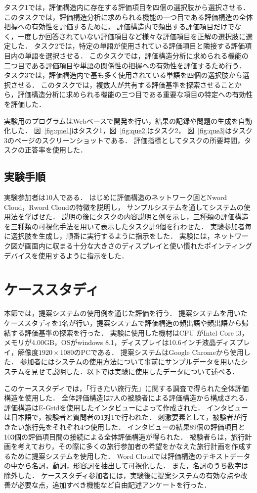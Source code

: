 \documentclass[syuuron]{kuee}
\begin{document}
			タスク1では，評価構造内に存在する評価項目を四個の選択肢から選択させる．
			このタスクでは，評価構造分析に求められる機能の一つ目である評価構造の全体把握への有効性を評価するために，
			評価構造内で頻出する評価項目だけでなく，一度しか回答されていない評価項目など様々な評価項目を正解の選択肢に選定した．
			タスク2では，特定の単語が使用されている評価項目と隣接する評価項目内の単語を選択させる．
			このタスクでは，評価構造分析に求められる機能の二つ目である評価項目や単語の関係性の把握への有効性を評価するため行う．
			タスク3では，評価構造内で基も多く使用されている単語を四個の選択肢から選択させる．
			このタスクでは，複数人が共有する評価基準を探索させることから，評価構造分析に求められる機能の三つ目である重要な項目の特定への有効性を評価した．
			
			実験用のプログラムはWebベースで開発を行い，結果の記録や問題の生成を自動化した．
			図~\ref{fig:que1}はタスク1，図~\ref{fig:que2}はタスク2，
			図~\ref{fig:que3}はタスク3のページのスクリーンショットである．
			評価指標としてタスクの所要時間，タスクの正答率を使用した．
		
		\subsection{実験手順}
			実験参加者は10人である．
			はじめに評価構造のネットワーク図とNword Cloud，Rword Cloudの特徴を説明し，
			サンプルシステムを通してシステムの使用法を学ばせた．
			説明の後にタスクの内容説明と例を示し，三種類の評価構造を三種類の可視化手法を用いて表示したタスク計9個を行わせた．
			実験参加者毎に選択肢を生成し，順番に実行するように指示をした．
			実験には，ネットワーク図が画面内に収まる十分な大きさのディスプレイと使い慣れたポインティングデバイスを使用するように指示をした．
		
	\section{ケーススタディ}
		本節では，提案システムの使用例を通じた評価を行う．
		提案システムを用いたケーススタディを1名が行い，提案システムで評価構造の頻出語や頻出語から帰結する評価基準の探索を行った．
		実験に使用した機材はCPU がIntel Core i3，メモリが4.00GB，OSがwindows 8.1，ディスプレイは10.6インチ液晶ディスプレイ，$解像度1920 \times 1080の$PCである．
		提案システムはGoogle Chromeから使用した．
		参加者にはシステムの使用方法について事前にサンプルデータを用いたシステムを見せて説明した．以下では実験に使用したデータについて述べる．
		
		このケーススタディでは，「行きたい旅行先」に関する調査で得られた全体評価構造を使用した．
		全体評価構造は7人の被験者による評価構造から構成される．
		評価構造はE-Gridを使用したインタビューによって作成された．
		インタビューは日本語で，被験者と質問者の1対1で行われた．
		刺激要素として，被験者が行きたい旅行先をそれぞれ4つ使用した．
		インタビューの結果89個の評価項目と103個の評価項目間の接続による全体評価構造が得られた．
		被験者らは，旅行計画を考えており，その際に多くの旅行参加者の希望をかなえた旅行計画を作成するために提案システムを使用した．
		Word Cloudでは評価構造のテキストデータの中から名詞，動詞，形容詞を抽出して可視化した．
		また，名詞のうち数字は除外した．
		ケーススタディ参加者には，実験後に提案システムの有効な点や改善が必要な点，追加すべき機能など自由記述アンケートを行った．
		
\end{document}
